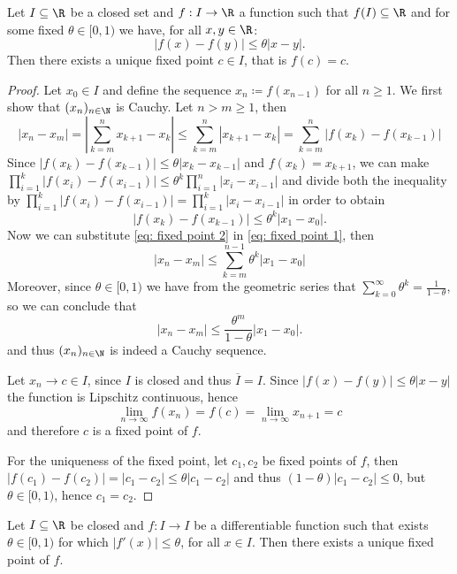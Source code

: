\begin{theorem}\label{thm: fixed point}
Let \(I \subseteq \R\) be a closed set and \(f: I \to \R\) a
function such that \(f(I) \subseteq \R\) and for some fixed \(\theta
\in [0, 1)\) we have, for all \(x, y \in \R\):
\[
|f(x) - f(y)| \leq \theta |x - y|.
\]
Then there exists a unique fixed point \(c \in I\), that is \(f(c) = c\).
\end{theorem}

\begin{proof}
Let \(x_0 \in I\) and define the sequence \(x_n \coloneq f(x_{n-1})\) for all \(n
\geq 1\). We first show that \((x_n)_{n \in \N}\) is Cauchy. Let \(n >
m \geq 1\), then
\begin{equation}\label{eq: fixed point 1}
|x_n - x_m| = \left| \sum_{k=m}^n x_{k+1} - x_k \right|
\leq \sum_{k=m}^n |x_{k+1} - x_k| = \sum_{k=m}^n |f(x_k) - f(x_{k-1})|
\end{equation}
Since \(|f(x_k) - f(x_{k-1})| \leq \theta |x_k - x_{k-1}|\) and \(f(x_k) =
x_{k+1}\), we can make  \(\prod_{i=1}^k |f(x_i) - f(x_{i-1})| \leq \theta^k
\prod_{i=1}^n |x_i - x_{i-1}|\) and divide both the inequality by
\(\prod_{i=1}^k |f(x_i) - f(x_{i-1})| = \prod_{i=1}^k |x_i - x_{i-1}|\) in
order to obtain
\begin{equation}\label{eq: fixed point 2}
|f(x_k) - f(x_{k-1})| \leq \theta^k |x_1 - x_0|.
\end{equation}
Now we can substitute \cref{eq: fixed point 2} in \cref{eq: fixed point 1},
then
\[
|x_n - x_m| \leq \sum_{k=m}^{n-1} \theta^k |x_1 - x_0|
\]
Moreover, since \(\theta \in [0, 1)\) we have from the geometric series that
\(\sum_{k=0}^\infty \theta^k = \frac{1}{1-\theta}\), so we can conclude that
\[
|x_n - x_m| \leq \frac{\theta^m}{1 - \theta} |x_1 - x_0|.
\]
and thus \((x_n)_{n \in \N}\) is indeed a Cauchy sequence.

Let \(x_n \to c \in I\), since \(I\) is closed and thus \(\overline I = I\).
Since \(|f(x) - f(y)| \leq \theta |x - y|\) the function is Lipschitz
continuous, hence
\[
\lim_{n \to \infty} f(x_n) = f(c) = \lim_{n \to \infty} x_{n+1} = c
\]
and therefore \(c\) is a fixed point of \(f\).

For the uniqueness of the fixed point, let \(c_1, c_2\) be fixed points of
\(f\), then \(|f(c_1) - f(c_2)| = |c_1 - c_2| \leq \theta |c_1 - c_2|\) and
thus \((1 - \theta)|c_1 - c_2| \leq 0\), but \(\theta \in [0, 1)\), hence
\(c_1 = c_2\).
\end{proof}

\begin{corollary}
Let \(I \subseteq \R\) be closed and \(f : I \to I\) be a
differentiable function such that exists \(\theta \in [0, 1)\) for which
\(|f'(x)| \leq \theta\), for all \(x \in I\). Then there exists a unique fixed
point of \(f\).
\end{corollary}

